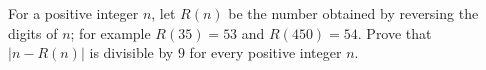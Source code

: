 For a positive integer $n$, let $R(n)$ be the number obtained by reversing the digits of $n$; for example $R(35)=53$ and $R(450)=54$. Prove that $|n-R(n)|$ is divisible by $9$ for every positive integer $n$.
